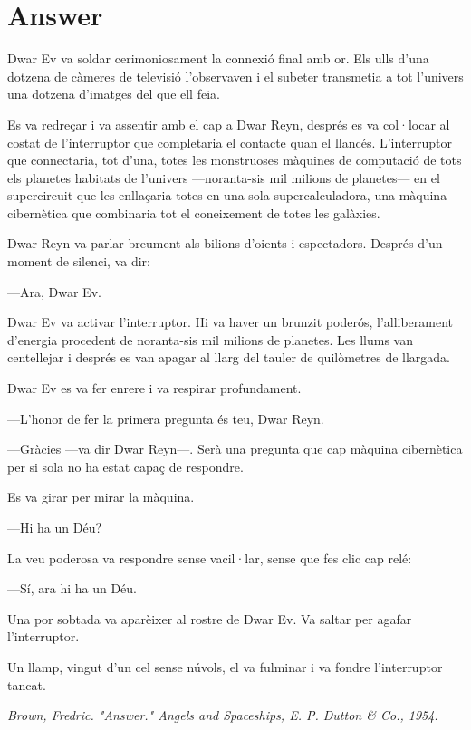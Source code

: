 
\chapter{Answer}




\begin{modernquote}
    Dwar Ev va soldar cerimoniosament la connexió final amb or. Els ulls d’una dotzena de càmeres de televisió l’observaven i el subeter transmetia a tot l’univers una dotzena d’imatges del que ell feia.

Es va redreçar i va assentir amb el cap a Dwar Reyn, després es va col·locar al costat de l’interruptor que completaria el contacte quan el llancés. L’interruptor que connectaria, tot d’una, totes les monstruoses màquines de computació de tots els planetes habitats de l’univers —noranta-sis mil milions de planetes— en el supercircuit que les enllaçaria totes en una sola supercalculadora, una màquina cibernètica que combinaria tot el coneixement de totes les galàxies.

Dwar Reyn va parlar breument als bilions d’oients i espectadors. Després d’un moment de silenci, va dir:

—Ara, Dwar Ev.


Dwar Ev va activar l’interruptor. Hi va haver un brunzit poderós, l’alliberament d’energia procedent de noranta-sis mil milions de planetes. Les llums van centellejar i després es van apagar al llarg del tauler de quilòmetres de llargada.

Dwar Ev es va fer enrere i va respirar profundament.

—L’honor de fer la primera pregunta és teu, Dwar Reyn.



—Gràcies —va dir Dwar Reyn—. Serà una pregunta que cap màquina cibernètica per si sola no ha estat capaç de respondre.


Es va girar per mirar la màquina.

—Hi ha un Déu?


La veu poderosa va respondre sense vacil·lar, sense que fes clic cap relé:

—Sí, ara hi ha un Déu.


Una por sobtada va aparèixer al rostre de Dwar Ev. Va saltar per agafar l’interruptor.

Un llamp, vingut d’un cel sense núvols, el va fulminar i va fondre l’interruptor tancat.


    \hfill \textit{Brown, Fredric. "Answer." Angels and Spaceships, E. P. Dutton \& Co., 1954.}
\end{modernquote}


